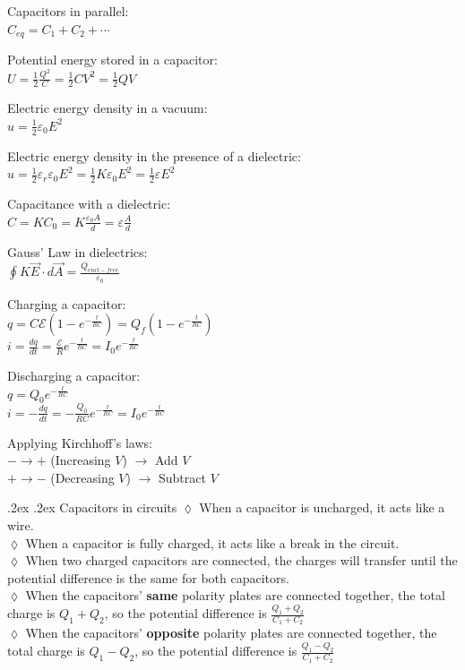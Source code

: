 \documentclass[10pt,landscape,a4paper]{article}
\makeatletter
\renewcommand{\subsection}{\@startsection{subsection}{1}{0mm}%
  {.2ex}%
  {.2ex}%
  {\sffamily\bfseries}}
\makeatother
\begin{document}
\begin{multicols*}{5}
  Capacitors in parallel: \\
  \(C_{eq} = C_1 + C_2 + \cdots\)

  Potential energy stored in a capacitor: \\
  \(U = \frac{1}{2} \frac{Q^2}{C} = \frac{1}{2} CV^2 = \frac{1}{2} QV\)

  Electric energy density in a vacuum: \\
  \(u = \frac{1}{2} \varepsilon_0 E^2\)

  Electric energy density in the presence of a dielectric: \\
  \(u = \frac{1}{2} \varepsilon_r \varepsilon_0 E^2 = \frac{1}{2} K \varepsilon_0 E^2 = \frac{1}{2} \varepsilon E^2\)

  Capacitance with a dielectric: \\
  \(C = KC_0 = K \frac{\varepsilon_0 A}{d} = \varepsilon \frac{A}{d}\)

  Gauss' Law in dielectrics: \\
  \(\oint K \vec{E} \cdot d \vec{A} = \frac{Q_{encl-free}}{\varepsilon_0}\)

  Charging a capacitor: \\
  \(q = C \mathcal{E} \left( 1 - e^{- \frac{t}{RC}} \right) = Q_f \left(1 - e^{- \frac{t}{RC}} \right)\) \\
  \(i = \frac{dq}{dt} = \frac{\mathcal{E}}{R} e^{-\frac{t}{RC}} = I_0 e^{-\frac{t}{RC}}\)

  Discharging a capacitor: \\
  \(q = Q_0 e^{- \frac{t}{RC}}\) \\
  \(i = -\frac{dq}{dt} = -\frac{Q_0}{RC} e^{-\frac{t}{RC}} = I_0 e^{-\frac{t}{RC}}\)

  Applying Kirchhoff's laws: \\
  \(- \rightarrow +\) (Increasing \(V\)) \(\longrightarrow\) Add \(V\) \\
  \(+ \rightarrow -\) (Decreasing \(V\)) \(\longrightarrow\) Subtract \(V\)

  \subsection{Capacitors in circuits}
  \(\lozenge\) When a capacitor is uncharged, it acts like a wire. \\
  \(\lozenge\) When a capacitor is fully charged, it acts like a break in the circuit. \\
  \(\lozenge\) When two charged capacitors are connected, the charges will transfer until the potential difference is the same for both capacitors. \\
  \(\lozenge\) When the capacitors' \textbf{same} polarity plates are connected together, the total charge is \(Q_1 + Q_2\), so the potential difference is \(\frac{Q_1 + Q_2}{C_1 + C_2}\) \\
  \(\lozenge\) When the capacitors' \textbf{opposite} polarity plates are connected together, the total charge is \(Q_1 - Q_2\), so the potential difference is \(\frac{Q_1 - Q_2}{C_1 + C_2}\) \\



\end{multicols*}
\end{document}
